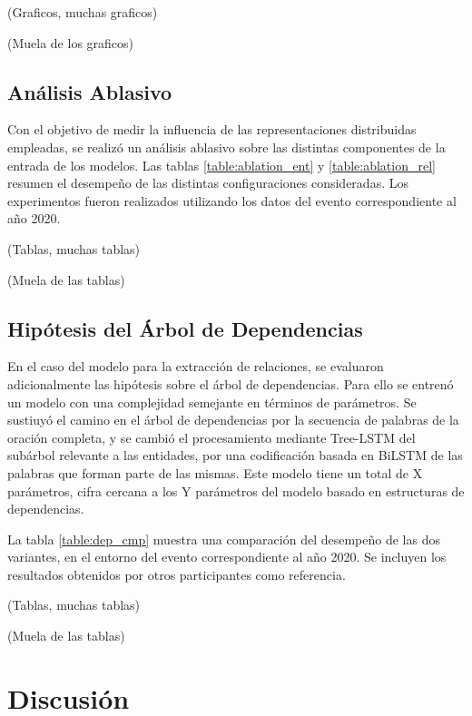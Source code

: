 (Graficos, muchas graficos)

(Muela de los graficos)

\subsection{Análisis Ablasivo}

Con el objetivo de medir la influencia de las representaciones distribuidas empleadas, se realizó un análisis ablasivo sobre las distintas componentes de la entrada de los modelos.
Las tablas \ref{table:ablation_ent} y \ref{table:ablation_rel} resumen el desempeño de las distintas configuraciones consideradas.
Los experimentos fueron realizados utilizando los datos del evento correspondiente al año 2020.

(Tablas, muchas tablas)

(Muela de las tablas)

\subsection{Hipótesis del Árbol de Dependencias}

En el caso del modelo para la extracción de relaciones, se evaluaron adicionalmente las hipótesis sobre el árbol de dependencias.
Para ello se entrenó un modelo con una complejidad semejante en términos de parámetros.
Se sustiuyó el camino en el árbol de dependencias por la secuencia de palabras de la oración completa, y se cambió el procesamiento mediante Tree-LSTM del subárbol relevante a las entidades, por una codificación basada en BiLSTM de las palabras que forman parte de las mismas.
Este modelo tiene un total de X parámetros, cifra cercana a los Y parámetros del modelo basado en estructuras de dependencias.

La tabla \ref{table:dep_cmp} muestra una comparación del desempeño de las dos variantes, en el entorno del evento correspondiente al año 2020. Se incluyen los resultados obtenidos por otros participantes como referencia.

(Tablas, muchas tablas)

(Muela de las tablas)


\section{Discusión}
